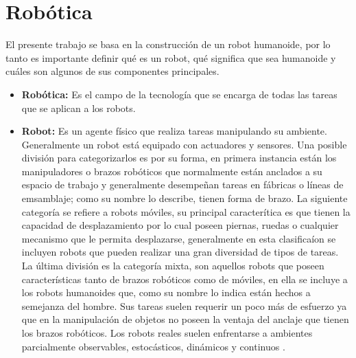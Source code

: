 \section{Robótica} \label{sect:robotica}
 
El presente trabajo se basa en la construcción de un robot humanoide, por lo tanto es importante definir qué es un robot, qué significa que sea humanoide y cuáles son algunos de sus componentes principales.

\begin{itemize}
\item{\textbf{Robótica:} Es el campo de la tecnología que se encarga de todas las tareas que se aplican a los robots.}

\item{\textbf{Robot:} Es un agente f\'isico que realiza tareas manipulando su ambiente.
Generalmente un robot está equipado con actuadores y sensores. Una posible divisi\'on para categorizarlos es por su forma, en primera instancia están los manipuladores o brazos rob\'oticos que normalmente están anclados a su espacio de trabajo y generalmente desempeñan tareas en f\'abricas o l\'ineas de emsamblaje; como su nombre lo describe, tienen forma de brazo. La siguiente categor\'ia se refiere a robots móviles, su principal caracter\'itica es que tienen la capacidad de desplazamiento por lo cual poseen piernas, ruedas o cualquier mecanismo que le permita desplazarse, generalmente en esta clasifica\'ion se incluyen robots que pueden realizar una gran diversidad de tipos de tareas. La \'ultima divisi\'on es la categor\'ia mixta, son aquellos robots que poseen caracter\'isticas tanto de brazos rob\'oticos como de móviles, en ella se incluye a los robots humanoides que, como su nombre lo indica están hechos a semejanza del hombre. Sus tareas suelen requerir un poco más de esfuerzo ya que en la manipulaci\'on de objetos no poseen la ventaja del anclaje que tienen los brazos rob\'oticos. Los robots reales suelen enfrentarse a ambientes parcialmente observables, estoc\'asticos, din\'amicos y continuos \cite{peterNorvig}.}



\end{itemize}
